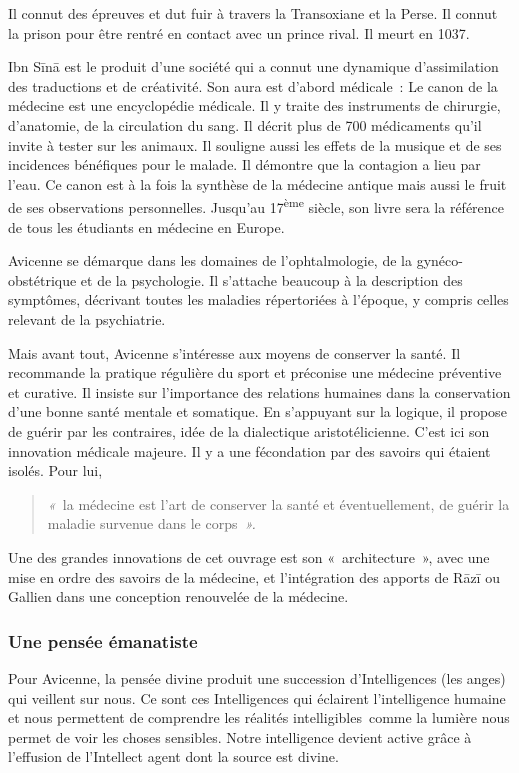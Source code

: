 Il connut des épreuves et dut fuir à travers la Transoxiane et la Perse.
Il connut la prison pour être rentré en contact avec un prince rival. Il
meurt en 1037.

Ibn Sīnā est le produit d'une société qui a connut une dynamique
d'assimilation des traductions et de créativité. Son aura est d'abord
médicale~: Le canon de la médecine est une encyclopédie médicale. Il y
traite des instruments de chirurgie, d'anatomie, de la circulation du
sang. Il décrit plus de 700 médicaments qu'il invite à tester sur les
animaux. Il souligne aussi les effets de la musique et de ses incidences
bénéfiques pour le malade. Il démontre que la contagion a lieu par
l'eau. Ce canon est à la fois la synthèse de la médecine antique mais
aussi le fruit de ses observations personnelles. Jusqu'au
17\textsuperscript{ème} siècle, son livre sera la référence de tous les
étudiants en médecine en Europe.

Avicenne se démarque dans les domaines de l'ophtalmologie, de la
gynéco-obstétrique et de la psychologie. Il s'attache beaucoup à la
description des symptômes, décrivant toutes les maladies répertoriées à
l'époque, y compris celles relevant de la psychiatrie.

Mais avant tout, Avicenne s'intéresse aux moyens de conserver la santé.
Il recommande la pratique régulière du sport et préconise une médecine
préventive et curative. Il insiste sur l'importance des relations
humaines dans la conservation d'une bonne santé mentale et somatique. En
s'appuyant sur la logique, il propose de guérir par les contraires, idée
de la dialectique aristotélicienne. C'est ici son innovation médicale
majeure. Il y a une fécondation par des savoirs qui étaient isolés. Pour
lui, 
\begin{quote}
    
\emph{«~}la médecine est l'art de conserver la santé et
éventuellement, de guérir la maladie survenue dans le corps\emph{~».}

\end{quote}
Une des grandes innovations de cet ouvrage est son «~architecture~»,
avec une mise en ordre des savoirs de la médecine, et l'intégration des
apports de Rāzī ou Gallien dans une conception renouvelée de la
médecine.

 
\subsubsection{Une pensée émanatiste
}

Pour Avicenne, la pensée divine produit une succession d'Intelligences
(les anges) qui veillent sur nous. Ce sont ces Intelligences qui
éclairent l'intelligence humaine et nous permettent de comprendre les
réalités intelligibles~comme la lumière nous permet de voir les choses
sensibles. Notre intelligence devient active grâce à l'effusion de
l'Intellect agent dont la source est divine.


